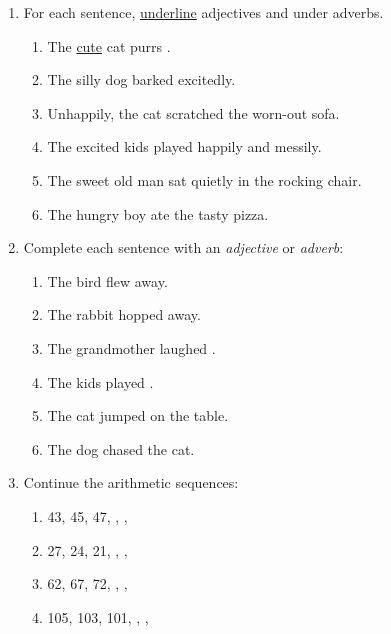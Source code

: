 \documentclass{tufte-book}
\begin{document}
\begin{enumerate}
  \item For each sentence, \underline{underline} adjectives and  under adverbs.
  \begin{enumerate}
    \item The \underline{cute} cat purrs .
    \item The silly dog barked excitedly.
    \item Unhappily, the cat scratched the worn-out sofa.
    \item The excited kids played happily and messily.
    \item The sweet old man sat quietly in the rocking chair.
    \item The hungry boy ate the tasty pizza.
  \end{enumerate}

  \item Complete each sentence with an \emph{adjective} or \emph{adverb}:
  \begin{enumerate}\bigskip
    \item The \dotfill bird flew away.\bigskip
    \item The \dotfill rabbit hopped away.\bigskip
    \item The grandmother laughed \dotfill.\bigskip
    \item The kids played \dotfill.\bigskip
    \item The \dotfill cat jumped on the table.\bigskip
    \item The \dotfill dog chased the cat.
  \end{enumerate}

  \item Continue the arithmetic sequences:
  \begin{enumerate}\bigskip
    \item 43, 45, 47, \dotfill, \dotfill, \dotfill\bigskip
    \item 27, 24, 21, \dotfill, \dotfill, \dotfill\bigskip
    \item 62, 67, 72, \dotfill, \dotfill, \dotfill\bigskip
    \item 105, 103, 101, \dotfill, \dotfill, \dotfill
  \end{enumerate}


\end{enumerate}
\end{document}
